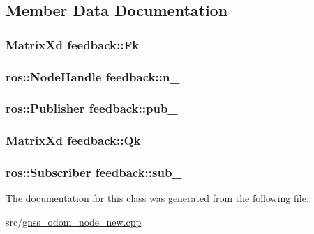 \subsection{Member Data Documentation}
\hypertarget{classfeedback_a6fd36b541e8509753e63618612b45bd7}{
\subsubsection[{Fk}]{\setlength{\rightskip}{0pt plus 5cm}Matrix\-Xd feedback\-::\-Fk\hspace{0.3cm}{\ttfamily [private]}}}\label{classfeedback_a6fd36b541e8509753e63618612b45bd7}
\hypertarget{classfeedback_a435b8d45f5bb871e154a30fe58b280b5}{
\subsubsection[{n\-\_\-}]{\setlength{\rightskip}{0pt plus 5cm}ros\-::\-Node\-Handle feedback\-::n\-\_\-\hspace{0.3cm}{\ttfamily [private]}}}\label{classfeedback_a435b8d45f5bb871e154a30fe58b280b5}
\hypertarget{classfeedback_a653000e469801bc400afeca34e91d91c}{
\subsubsection[{pub\-\_\-}]{\setlength{\rightskip}{0pt plus 5cm}ros\-::\-Publisher feedback\-::pub\-\_\-\hspace{0.3cm}{\ttfamily [private]}}}\label{classfeedback_a653000e469801bc400afeca34e91d91c}
\hypertarget{classfeedback_aa05bfc581667f5b071a4eb83822ae777}{
\subsubsection[{Qk}]{\setlength{\rightskip}{0pt plus 5cm}Matrix\-Xd feedback\-::\-Qk\hspace{0.3cm}{\ttfamily [private]}}}\label{classfeedback_aa05bfc581667f5b071a4eb83822ae777}
\hypertarget{classfeedback_aef7fb754d22cd74aa29734975c678146}{
\subsubsection[{sub\-\_\-}]{\setlength{\rightskip}{0pt plus 5cm}ros\-::\-Subscriber feedback\-::sub\-\_\-\hspace{0.3cm}{\ttfamily [private]}}}\label{classfeedback_aef7fb754d22cd74aa29734975c678146}


The documentation for this class was generated from the following file\-:\begin{DoxyCompactItemize}
\item 
src/\hyperlink{gnss__odom__node__new_8cpp}{gnss\-\_\-odom\-\_\-node\-\_\-new.\-cpp}\end{DoxyCompactItemize}
